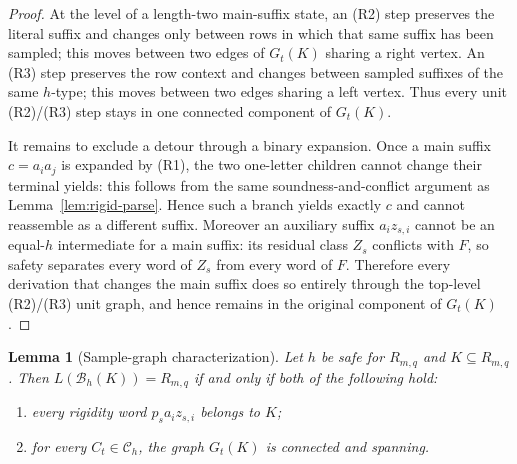 \documentclass[11pt]{article}
\newtheorem{lemma}[definition]{Lemma}
\newcommand{\B}{\mathcal B}
\begin{document}
\begin{proof}
At the level of a length-two main-suffix state, an (R2) step preserves the
literal suffix and changes only between rows in which that same suffix has
been sampled; this moves between two edges of $G_t(K)$ sharing a right
vertex.  An (R3) step preserves the row context and changes between sampled
suffixes of the same $h$-type; this moves between two edges sharing a left
vertex.  Thus every unit (R2)/(R3) step stays in one connected component of
$G_t(K)$.

It remains to exclude a detour through a binary expansion.  Once a main suffix
$c=a_i a_j$ is expanded by (R1), the two one-letter children cannot change
their terminal yields: this follows from the same soundness-and-conflict
argument as Lemma~\ref{lem:rigid-parse}.  Hence such a branch yields exactly
$c$ and cannot reassemble as a different suffix.  Moreover an auxiliary
suffix $a_i z_{s,i}$ cannot be an equal-$h$ intermediate for a main suffix:
its residual class $Z_s$ conflicts with $F$, so safety separates every word of
$Z_s$ from every word of $F$.  Therefore every derivation that changes the
main suffix does so entirely through the top-level (R2)/(R3) unit graph, and
hence remains in the original component of $G_t(K)$.
\end{proof}

\begin{lemma}[Sample-graph characterization]
\label{lem:graph-characterization}
Let $h$ be safe for $R_{m,q}$ and $K\subseteq R_{m,q}$.  Then
$L(\B_h(K))=R_{m,q}$ if and only if both of the following hold:
\begin{enumerate}[label=(\roman*)]
\item every rigidity word $p_sa_i z_{s,i}$ belongs to $K$;
\item for every $C_t\in\mathcal C_h$, the graph $G_t(K)$ is connected and
spanning.
\end{enumerate}
\end{lemma}
\end{document}
